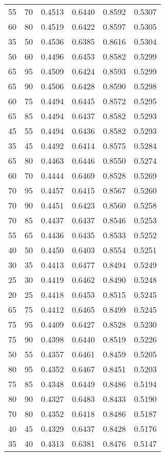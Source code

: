 \begin{center}
\begin{longtable}{|l|l|l|l|l|l|}
55 & 70 & 0.4513 & 0.6440 & 0.8592 & 0.5307 \\
60 & 80 & 0.4519 & 0.6422 & 0.8597 & 0.5305 \\
35 & 50 & 0.4536 & 0.6385 & 0.8616 & 0.5304 \\
50 & 60 & 0.4496 & 0.6453 & 0.8582 & 0.5299 \\
65 & 95 & 0.4509 & 0.6424 & 0.8593 & 0.5299 \\
65 & 90 & 0.4506 & 0.6428 & 0.8590 & 0.5298 \\
60 & 75 & 0.4494 & 0.6445 & 0.8572 & 0.5295 \\
65 & 85 & 0.4494 & 0.6437 & 0.8582 & 0.5293 \\
45 & 55 & 0.4494 & 0.6436 & 0.8582 & 0.5293 \\
35 & 45 & 0.4492 & 0.6414 & 0.8575 & 0.5284 \\
65 & 80 & 0.4463 & 0.6446 & 0.8550 & 0.5274 \\
60 & 70 & 0.4444 & 0.6469 & 0.8528 & 0.5269 \\
70 & 95 & 0.4457 & 0.6415 & 0.8567 & 0.5260 \\
70 & 90 & 0.4451 & 0.6423 & 0.8560 & 0.5258 \\
70 & 85 & 0.4437 & 0.6437 & 0.8546 & 0.5253 \\
55 & 65 & 0.4436 & 0.6435 & 0.8533 & 0.5252 \\
40 & 50 & 0.4450 & 0.6403 & 0.8554 & 0.5251 \\
30 & 35 & 0.4413 & 0.6477 & 0.8494 & 0.5249 \\
25 & 30 & 0.4419 & 0.6462 & 0.8490 & 0.5248 \\
20 & 25 & 0.4418 & 0.6453 & 0.8515 & 0.5245 \\
65 & 75 & 0.4412 & 0.6465 & 0.8499 & 0.5245 \\
75 & 95 & 0.4409 & 0.6427 & 0.8528 & 0.5230 \\
75 & 90 & 0.4398 & 0.6440 & 0.8519 & 0.5226 \\
50 & 55 & 0.4357 & 0.6461 & 0.8459 & 0.5205 \\
80 & 95 & 0.4352 & 0.6467 & 0.8451 & 0.5203 \\
75 & 85 & 0.4348 & 0.6449 & 0.8486 & 0.5194 \\
80 & 90 & 0.4327 & 0.6483 & 0.8433 & 0.5190 \\
70 & 80 & 0.4352 & 0.6418 & 0.8486 & 0.5187 \\
40 & 45 & 0.4329 & 0.6437 & 0.8428 & 0.5176 \\
35 & 40 & 0.4313 & 0.6381 & 0.8476 & 0.5147 \\

\end{longtable}
\end{center}
